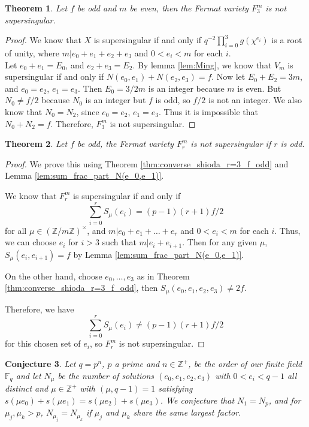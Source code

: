 \documentclass{article}
\newcommand{\Z}{\mathbb{Z}}
\newcommand{\F}{\mathbb{F}}
\newtheorem{theorem}{Theorem}[section]
\newtheorem{conjecture}[theorem]{Conjecture}
\theoremstyle{definition}
\theoremstyle{definition}
\theoremstyle{remark}
\begin{document}
\begin{theorem}
Let $f$ be odd and $m$ be even, then the Fermat variety $F^m_3$ is not supersingular.
\end{theorem}
\begin{proof}
We know that $X$ is supersingular if and only if $q^{-2}\prod_{i = 0}^3 g(\chi^{e_i})$ is a root of unity, where $m| e_0 + e_1 + e_2 + e_3$ and $0 < e_i < m$ for each $i$.\\
Let $e_0 + e_1 = E_0$, and $e_2 + e_3 = E_2$. By lemma \ref{lem:Ming}, we know that $V_m$ is supersingular if and only if $N(e_0, e_1) + N(e_2, e_3) = f$.
Now let $E_0 + E_2 = 3m$, and $e_0 = e_2$, $e_1 = e_3$. Then $E_0 = 3/2 m$ is an integer because $m$ is even. But $N_0 \ne f/2$ because $N_0$ is an integer but $f$ is odd, so $f/2$ is not an integer. We also know that $N_0 = N_2$, since $e_0 = e_2$, $e_1 = e_3$. Thus it is impossible that $N_0 + N_2 = f$. Therefore, $F^m_3$ is not supersingular.
\end{proof}
\begin{theorem}\label{thm:converse_shioda_r_odd_f_odd}
Let $f$ be odd, the Fermat variety $F^m_{r}$ is not supersingular if $r$ is odd.
\end{theorem}
\begin{proof}
We prove this using Theorem \ref{thm:converse_shioda_r=3_f_odd} and Lemma \ref{lem:sum_frac_part_N(e_0,e_1)}. 

We know that $F^m_r$ is supersingular if and only if \[\sum_{i = 0}^r S_\mu (e_i) = (p-1)(r+1)f/2\]
for all $\mu \in (\Z/m\Z)^\times$, and $m| e_0 + e_1 + \dots + e_r$ and $0 < e_i < m$ for each $i$. 
Thus, we can choose $e_i$ for $i > 3$ such that $m| e_i + e_{i+1}$. Then for any given $\mu$, $S_\mu(e_i, e_{i+1}) = f$ by Lemma \ref{lem:sum_frac_part_N(e_0,e_1)}. 

On the other hand, choose $e_0, \dots, e_3$ as in Theorem  \ref{thm:converse_shioda_r=3_f_odd}, then $S_\mu (e_0, e_1, e_2, e_3) \ne 2f$. 

Therefore, we have \[\sum_{i = 0}^r S_\mu (e_i) \ne (p-1)(r+1)f/2\] for this chosen set of $e_i$, so $F^m_{r}$ is not supersingular.

\end{proof}

\begin{conjecture} Let $q = p^n$, $p$ a prime and $n \in \mathbb{Z}^+$, be the order of our finite field $\F_q$ and let $N_\mu$ be the number of solutions $(e_0, e_1, e_2, e_3)$ with $0 < e_i < q-1$ all distinct and $\mu \in \mathbb{Z}^+$ with $(\mu, q-1) = 1$ satisfying $s(\mu e_0) + s(\mu e_1) = s(\mu e_2) + s(\mu e_3)$. We conjecture that $N_1 = N_p$, and for $\mu_j, \mu_k > p$, $N_{\mu_{j}} = N_{\mu_{k}}$ if $\mu_j$ and $\mu_k$ share the same largest factor.
\end{conjecture}
\end{document}
